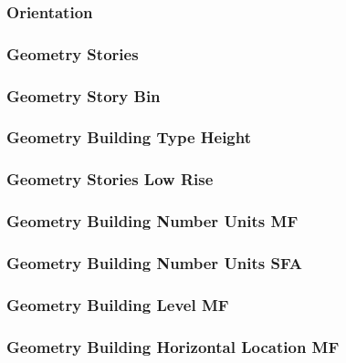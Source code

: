 \subsubsection{Orientation} \label{sec:orientation}


\subsubsection{Geometry Stories}


\subsubsection{Geometry Story Bin}


\subsubsection{Geometry Building Type Height}


\subsubsection{Geometry Stories Low Rise}


\subsubsection{Geometry Building Number Units MF}


\subsubsection{Geometry Building Number Units SFA}


\subsubsection{Geometry Building Level MF}


\subsubsection{Geometry Building Horizontal Location MF}


